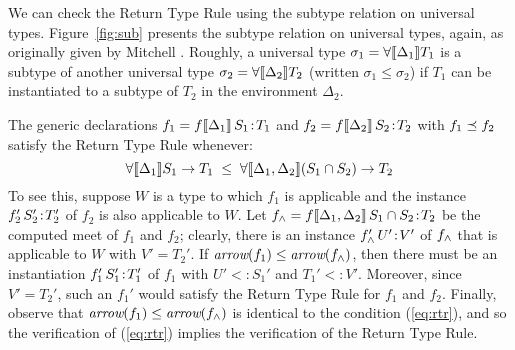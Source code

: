 We can check the Return Type Rule using the subtype relation on universal types.
Figure~\ref{fig:sub} presents the subtype relation on universal types, again,
as originally given by Mitchell \cite{mitchell88}.
Roughly, a universal type $\sigma_1 = \forall\llbracket {\Delta_1} \rrbracket T_1$ is a subtype of another universal
type $\sigma_2 = \forall\llbracket {\Delta_2} \rrbracket T_2$ (written $\sigma_1 \le \sigma_2$) if
$T_1$ can be instantiated to a subtype of $T_2$ in the environment $\Delta_2$.

The generic declarations $f_1 = \mbox{\ensuremath{f \llbracket {\Delta_1} \rrbracket\, S_1\!:\!T_1}}$ 
and $f_2 = \mbox{\ensuremath{f \llbracket {\Delta_2} \rrbracket\, S_2\!:\!T_2}}$ with $f_1 \preceq f_2$ satisfy the Return Type Rule
whenever:
\renewcommand{\theequation}{\fnsymbol{equation}}
\begin{equation} \label{eq:rtr}
  \forall\llbracket {\Delta_1} \rrbracket S_1 \rightarrow T_1 \; \le \; \forall\llbracket {\Delta_1, \Delta_2} \rrbracket(S_1 \cap S_2) \rightarrow T_2
\end{equation}
To see this, suppose $W$ is a type to which $f_1$ is applicable and the instance $\mbox{\ensuremath{{f_2'}\,{S_2'}\!:\!{T_2'}}}$ of $f_2$
is also applicable to $W$.
Let $f_\wedge = \mbox{\ensuremath{f \llbracket {\Delta_1, \Delta_2} \rrbracket\, S_1 \cap S_2\!:\!T_2}}$ be the
computed meet of $f_1$ and $f_2$;
clearly, there is an instance 
$\mbox{\ensuremath{{f_\wedge'}\,{U'}\!:\!{V'}}}$ of $f_\wedge$ 
that is applicable to $W$ with $V' = T_2'$. 
If $\textit{arrow}(f_1) \le \textit{arrow}(f_\wedge)$,
then there must be an instantiation $\mbox{\ensuremath{{f_1'}\,{S_1'}\!:\!{T_1'}}}$ of $f_1$
with $U' <: S_1'$ and $T_1' <: V'$. Moreover, since $V'=T_2'$,
such an $f_1'$ would satisfy the Return Type Rule for $f_1$ and $f_2$.
Finally, observe that $\textit{arrow}(f_1) \le \textit{arrow}(f_\wedge)$ is identical to the
condition (\ref{eq:rtr}), and so the verification of (\ref{eq:rtr}) implies
the verification of the Return Type Rule.

